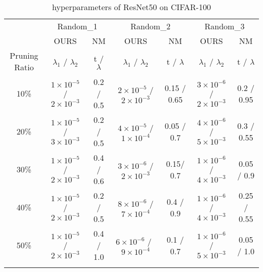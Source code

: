 \begin{table*}[h]
\begin{tabular}{c|c|c|c|c|c|c}\Xhline{2\arrayrulewidth}
\multirow{2}{*}{Criterion} & \multicolumn{2}{c|}{Random\_1}& \multicolumn{2}{c|}{Random\_2}& \multicolumn{2}{c}{Random\_3}\\ \cline{2-7} 
    & OURS& NM& OURS& NM& OURS& NM\\ \hline
Pruning Ratio& $\lambda_1$ / $\lambda_2$ & t / $\lambda$ & $\lambda_1$ / $\lambda_2$ & t / $\lambda$ & $\lambda_1$ / $\lambda_2$ & t / $\lambda$ \\ \Xhline{2\arrayrulewidth}
10\%& $1\times10^{-5}$ / $2\times10^{-3}$ & 0.2 / 0.5    & $2\times10^{-5}$ / $2\times10^{-3}$   & 0.15 / 0.65  & $3\times10^{-6}$ / $2\times10^{-3}$   & 0.2 / 0.95 \\ \hline
20\%& $1\times10^{-5}$ / $3\times10^{-3}$ & 0.2 / 0.5    & $4\times10^{-5}$ / $1\times10^{-4}$   & 0.05 / 0.7   & $4\times10^{-6}$ / $5\times10^{-3}$   & 0.3 / 0.55 \\ \hline
30\%& $1\times10^{-5}$ / $2\times10^{-3}$ & 0.4 / 0.6    & $3\times10^{-6}$ / $2\times10^{-3}$   & 0.15/ 0.7    & $1\times10^{-6}$ / $4\times10^{-3}$   & 0.05 / 0.9  \\ \hline
40\%& $1\times10^{-5}$ / $2\times10^{-3}$ & 0.2 / 0.5    & $8\times10^{-6}$ / $7\times10^{-4}$   & 0.4 / 0.9     & $1\times10^{-6}$ / $4\times10^{-3}$   & 0.25 / 0.55  \\ \hline
50\%& $1\times10^{-5}$ / $2\times10^{-3}$ & 0.4 / 1.0    & $6\times10^{-6}$ /~$9\times10^{-4}$   & 0.1 / 0.7    & $1\times10^{-6}$ / $5\times10^{-3}$   & 0.05 / 1.0  \\ \Xhline{2\arrayrulewidth}
\end{tabular}%
\caption{hyperparameters of ResNet50 on CIFAR-100}
\label{tab:param:ResNet50:cifar100}
\vspace{2mm}
\end{table*}

